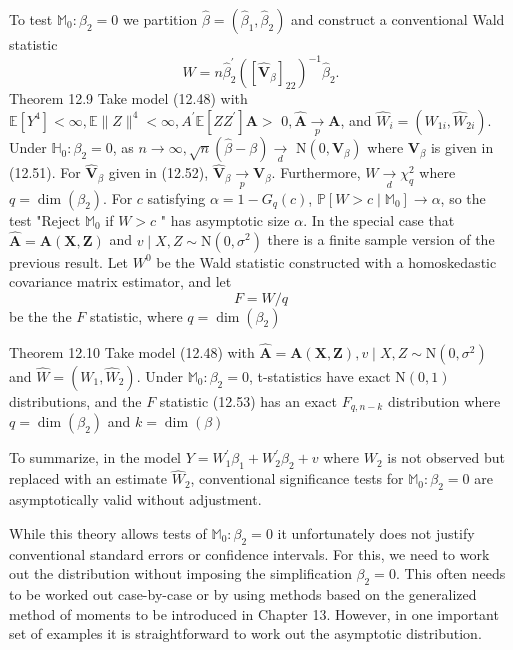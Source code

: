 \documentclass[10pt]{article}
\begin{document}
To test $\mathbb{M}_{0}: \beta_{2}=0$ we partition $\widehat{\beta}=\left(\widehat{\beta}_{1}, \widehat{\beta}_{2}\right)$ and construct a conventional Wald statistic
$$
W=n \widehat{\beta}_{2}^{\prime}\left(\left[\widehat{\boldsymbol{V}}_{\beta}\right]_{22}\right)^{-1} \widehat{\beta}_{2} .
$$
Theorem 12.9 Take model (12.48) with $\mathbb{E}\left[Y^{4}\right]<\infty, \mathbb{E}\|Z\|^{4}<\infty, A^{\prime} \mathbb{E}\left[Z Z^{\prime}\right] \boldsymbol{A}>$ $0, \widehat{\boldsymbol{A}} \underset{p}{\longrightarrow} \boldsymbol{A}$, and $\widehat{W}_{i}=\left(W_{1 i}, \widehat{W}_{2 i}\right)$. Under $\mathbb{H}_{0}: \beta_{2}=0$, as $n \rightarrow \infty, \sqrt{n}(\widehat{\beta}-\beta) \underset{d}{\longrightarrow}$ $\mathrm{N}\left(0, \boldsymbol{V}_{\beta}\right)$ where $\boldsymbol{V}_{\beta}$ is given in (12.51). For $\widehat{\boldsymbol{V}}_{\beta}$ given in (12.52), $\widehat{\boldsymbol{V}}_{\beta} \underset{p}{\longrightarrow} \boldsymbol{V}_{\beta}$. Furthermore, $W \underset{d}{\longrightarrow} \chi_{q}^{2}$ where $q=\operatorname{dim}\left(\beta_{2}\right)$. For $c$ satisfying $\alpha=1-G_{q}(c)$, $\mathbb{P}\left[W>c \mid \mathbb{M}_{0}\right] \rightarrow \alpha$, so the test "Reject $\mathbb{M}_{0}$ if $W>c$ " has asymptotic size $\alpha$. In the special case that $\widehat{\boldsymbol{A}}=\boldsymbol{A}(\boldsymbol{X}, \boldsymbol{Z})$ and $v \mid X, Z \sim \mathrm{N}\left(0, \sigma^{2}\right)$ there is a finite sample version of the previous result. Let $W^{0}$ be the Wald statistic constructed with a homoskedastic covariance matrix estimator, and let
$$
F=W / q
$$
be the the $F$ statistic, where $q=\operatorname{dim}\left(\beta_{2}\right)$

Theorem 12.10 Take model (12.48) with $\widehat{\boldsymbol{A}}=\boldsymbol{A}(\boldsymbol{X}, \boldsymbol{Z}), v \mid X, Z \sim \mathrm{N}\left(0, \sigma^{2}\right)$ and $\widehat{W}=\left(W_{1}, \widehat{W}_{2}\right)$. Under $\mathbb{M}_{0}: \beta_{2}=0$, t-statistics have exact $\mathrm{N}(0,1)$ distributions, and the $F$ statistic (12.53) has an exact $F_{q, n-k}$ distribution where $q=\operatorname{dim}\left(\beta_{2}\right)$ and $k=\operatorname{dim}(\beta)$

To summarize, in the model $Y=W_{1}^{\prime} \beta_{1}+W_{2}^{\prime} \beta_{2}+v$ where $W_{2}$ is not observed but replaced with an estimate $\widehat{W}_{2}$, conventional significance tests for $\mathbb{M}_{0}: \beta_{2}=0$ are asymptotically valid without adjustment.

While this theory allows tests of $\mathbb{M}_{0}: \beta_{2}=0$ it unfortunately does not justify conventional standard errors or confidence intervals. For this, we need to work out the distribution without imposing the simplification $\beta_{2}=0$. This often needs to be worked out case-by-case or by using methods based on the generalized method of moments to be introduced in Chapter 13. However, in one important set of examples it is straightforward to work out the asymptotic distribution.
\end{document}
